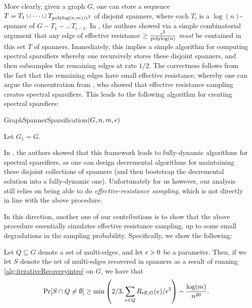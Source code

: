 \documentclass{article}
\begin{document}
More clearly, given a graph $G$, one can store a sequence $T = T_1 \cup \dots \cup T_{\operatorname{polylog}(n,m) / \epsilon^2}$ of disjoint spanners, where each $T_i$ is a $\log(n)$-spanner of $G - T_1 - \dots T_{i-1}$. In \cite{ADKKP16}, the authors showed via a simple combinatorial argument that any edge of effective resistance $\geq \frac{\epsilon^2}{\operatorname{polylog}(n)}$ \emph{must} be contained in this set $T$ of spanners. Immediately, this implies a simple algorithm for computing spectral sparsifiers whereby one recursively stores these disjoint spanners, and then subsamples the remaining edges at rate $1/2$. The correctness follows from the fact that the remaining edges have small effective resistance, whereby one can argue the concentration from \cite{ST11, SS11}, who showed that effective resistance sampling creates spectral sparsifiers. This leads to the following algorithm for creating spectral sparsfiers:

\begin{algorithm}[H]
    \caption{GraphSpannerSparsification$(G, n, m, \epsilon)$}\label{alg:iterativeRecoveryintro}
    Let $G_1 = G$. \\
\end{algorithm}

In \cite{ADKKP16}, the authors showed that this framework leads to fully-dynamic algorithms for spectral sparsifiers, as one can design decremental algorithms for maintaining these disjoint collections of spanners (and then bootstrap the decremental solution into a fully-dynamic one). Unfortunately for us however, our analysis still relies on being able to do \emph{effective-resistance sampling}, which is not directly in line with the above procedure.

In this direction, another one of our contributions is to show that the above procedure essentially simulates effective resistance sampling, up to some small degradations in the sampling probability. Specifically, we show the following:

\begin{lemma}\label{clm:ERSumRecoveryintro}
    Let $Q \subseteq G$ denote a set of multi-edges, and let $\epsilon > 0$ be a parameter. Then, if we let $S$ denote the set of multi-edges recovered in spanners as a result of running \cref{alg:iterativeRecoveryintro} on $G$, we have that 
    \[
    \Pr[S \cap Q \neq \emptyset] \geq \min \left (2/3, \sum_{e \in Q} R_{\mathrm{eff}, G}(e) / \epsilon^2 \right ) - \frac{\log(m)}{n^{20}}. 
    \]
\end{lemma}
\end{document}
